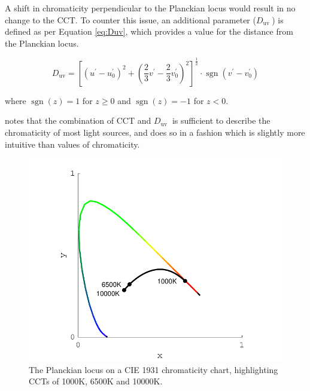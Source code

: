 A shift in chromaticity perpendicular to the Planckian locus would result in no change to the \gls{CCT}. To counter this issue, an additional parameter ($D_{\text {uv }}$) is defined \citep{ohno_practical_2014} as per Equation \ref{eq:Duv}, which provides a value for the distance from the Planckian locus.

\begin{equation}
D_{\mathrm{uv}}=\left[\left(u^{\prime}-u_{0}^{\prime}\right)^{2}+\left(\frac{2}{3} v^{\prime}-\frac{2}{3} v_{0}^{\prime}\right)^{2}\right]^{\frac{1}{2}} \cdot \operatorname{sgn}\left(v^{\prime}-v_{0}^{\prime}\right)
\label{eq:Duv}
\end{equation}

where $\operatorname{sgn}(z)=1$ for $z\geq0$ and $\operatorname{sgn}(z)=-1$ for $z<0$.

\citet{ohno_practical_2014} notes that the combination of \gls{CCT} and $D_{\text {uv }}$ is sufficient to describe the chromaticity of most light sources, and does so in a fashion which is slightly more intuitive than values of chromaticity.

\begin{figure}[htbp]
\includegraphics[max width=\textwidth]{figs/LitRev/BBR.pdf}
\caption{The Planckian locus on a \gls{CIE} 1931 chromaticity chart, highlighting \glspl{CCT} of 1000K, 6500K and 10000K.}
\label{fig:BBR}
\end{figure}

\clearpage